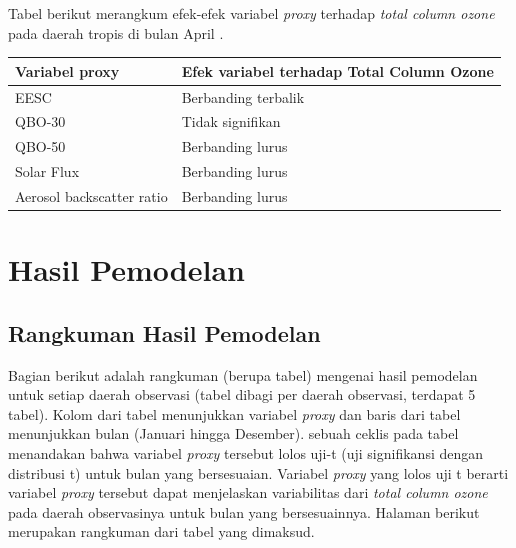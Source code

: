 \begin{enumerate}
Tabel berikut merangkum  efek-efek variabel  \textit{proxy} terhadap \textit{total column ozone} pada daerah tropis di bulan April .
\begin{table}[!ht]
    \centering
    \begin{tabular}{|l|l|}
    \hline
        Variabel proxy & Efek variabel terhadap Total Column Ozone \\ \hline
        EESC  & Berbanding terbalik \\ \hline
        QBO-30 & Tidak signifikan \\ \hline
        QBO-50 & Berbanding lurus\\ \hline
        Solar Flux & Berbanding lurus\\ \hline
        Aerosol backscatter ratio & Berbanding lurus\\ \hline
    \end{tabular}
\end{table}

\section{Hasil Pemodelan}\label{hasil pemodelan}

\subsection{Rangkuman Hasil Pemodelan}
Bagian berikut adalah rangkuman (berupa tabel) mengenai hasil pemodelan untuk setiap daerah observasi (tabel dibagi per daerah  observasi, terdapat 5 tabel). Kolom dari tabel menunjukkan variabel \textit{proxy} dan baris dari tabel menunjukkan bulan (Januari hingga Desember). sebuah ceklis pada tabel menandakan bahwa variabel \textit{proxy} tersebut lolos uji-t (uji signifikansi dengan distribusi t) untuk bulan yang bersesuaian. Variabel \textit{proxy} yang  lolos uji t berarti variabel \textit{proxy} tersebut dapat menjelaskan variabilitas dari \textit{total column ozone} pada daerah observasinya untuk bulan yang bersesuainnya. Halaman berikut merupakan rangkuman dari tabel yang dimaksud.

\begin{table}[p]


\end{table}
\end{enumerate}

